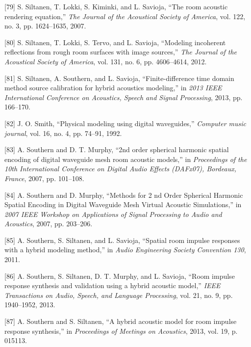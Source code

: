 \documentclass[]{scrreprt}
\begin{document}
\hypertarget{ref-siltanenux5froomux5f2007}{}
{[}79{]} S. Siltanen, T. Lokki, S. Kiminki, and L. Savioja, ``The room
acoustic rendering equation,'' \emph{The Journal of the Acoustical
Society of America}, vol. 122, no. 3, pp. 1624--1635, 2007.

\hypertarget{ref-siltanenux5fmodelingux5f2012}{}
{[}80{]} S. Siltanen, T. Lokki, S. Tervo, and L. Savioja, ``Modeling
incoherent reflections from rough room surfaces with image sources,''
\emph{The Journal of the Acoustical Society of America}, vol. 131, no.
6, pp. 4606--4614, 2012.

\hypertarget{ref-siltanenux5ffinite-differenceux5f2013}{}
{[}81{]} S. Siltanen, A. Southern, and L. Savioja, ``Finite-difference
time domain method source calibration for hybrid acoustics modeling,''
in \emph{2013 IEEE International Conference on Acoustics, Speech and
Signal Processing}, 2013, pp. 166--170.

\hypertarget{ref-smithux5fphysicalux5f1992}{}
{[}82{]} J. O. Smith, ``Physical modeling using digital waveguides,''
\emph{Computer music journal}, vol. 16, no. 4, pp. 74--91, 1992.

\hypertarget{ref-southernux5f2ndux5f2007}{}
{[}83{]} A. Southern and D. T. Murphy, ``2nd order spherical harmonic
spatial encoding of digital waveguide mesh room acoustic models,'' in
\emph{Proceedings of the 10th International Conference on Digital Audio
Effects (DAFx07), Bordeaux, France}, 2007, pp. 101--108.

\hypertarget{ref-southernux5fmethodsux5f2007}{}
{[}84{]} A. Southern and D. Murphy, ``Methods for 2 nd Order Spherical
Harmonic Spatial Encoding in Digital Waveguide Mesh Virtual Acoustic
Simulations,'' in \emph{2007 IEEE Workshop on Applications of Signal
Processing to Audio and Acoustics}, 2007, pp. 203--206.

\hypertarget{ref-southernux5fspatialux5f2011}{}
{[}85{]} A. Southern, S. Siltanen, and L. Savioja, ``Spatial room
impulse responses with a hybrid modeling method,'' in \emph{Audio
Engineering Society Convention 130}, 2011.

\hypertarget{ref-southernux5froomux5f2013}{}
{[}86{]} A. Southern, S. Siltanen, D. T. Murphy, and L. Savioja, ``Room
impulse response synthesis and validation using a hybrid acoustic
model,'' \emph{IEEE Transactions on Audio, Speech, and Language
Processing}, vol. 21, no. 9, pp. 1940--1952, 2013.

\hypertarget{ref-southernux5fhybridux5f2013}{}
{[}87{]} A. Southern and S. Siltanen, ``A hybrid acoustic model for room
impulse response synthesis,'' in \emph{Proceedings of Meetings on
Acoustics}, 2013, vol. 19, p. 015113.
\end{document}
